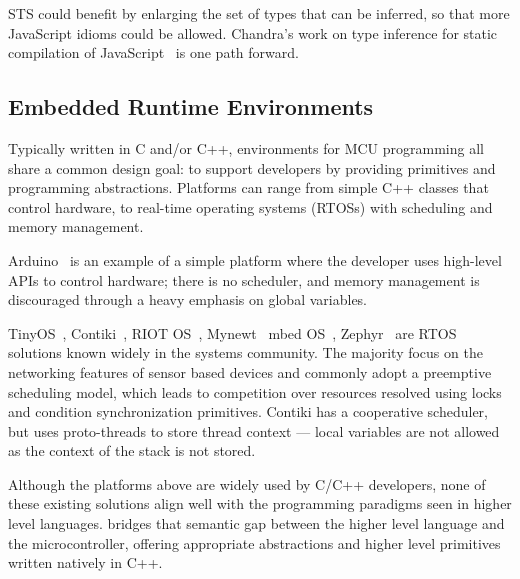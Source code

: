 STS could benefit by enlarging the set of types
that can be inferred, so that more JavaScript idioms could be allowed.
Chandra's work on type inference for static compilation of
JavaScript~\cite{ChandraOOPSLA2016} is one path forward.

\subsection{Embedded Runtime Environments}

Typically written in C and/or C++, environments for MCU programming all share a common design goal: to support developers by providing primitives and programming abstractions. Platforms can range from simple C++ classes that control hardware, to real-time operating systems (RTOSs) with scheduling and memory management.

Arduino~\cite{buildingArduino2014} is an example of a simple platform where the developer uses
high-level APIs to control hardware; there is no scheduler, and memory management
is discouraged through a heavy emphasis on global variables.

TinyOS~\cite{levis2005tinyos}, Contiki~\cite{dunkels2012contiki}, RIOT OS~\cite{baccelli2013riot}, Mynewt~\cite{ApacheMy53:online} mbed OS~\cite{ARMmbed}, Zephyr~\cite{HomeZeph63:online} are RTOS solutions known widely in the systems community. The majority focus on the networking features of sensor based devices and commonly adopt a preemptive scheduling model, which leads to competition over resources resolved using locks and condition synchronization primitives. Contiki has a cooperative scheduler, but uses proto-threads to store thread context --- local variables are not allowed as the context of the stack is not stored.

Although the platforms above are widely used by C/C++ developers, none of these existing solutions align well with the programming paradigms seen in higher level languages.
\CO bridges that semantic gap between the higher level language and the microcontroller, offering appropriate abstractions and higher level primitives written natively in C++.

